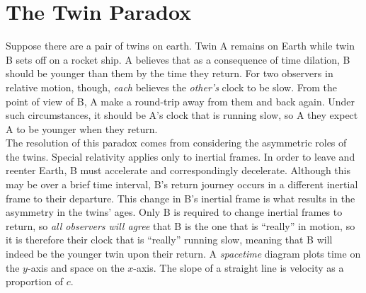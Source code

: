 \documentclass{subfiles}
\begin{document}
	\section{The Twin Paradox}
		Suppose there are a pair of twins on earth. Twin A remains on Earth while twin B sets off on a rocket ship. A believes that as a consequence of time dilation, B should be younger than them by the time they return. For two observers in relative motion, though, \textit{each} believes the \textit{other's} clock to be slow. From the point of view of B, A make a round-trip away from them and back again. Under such circumstances, it should be A's clock that is running slow, so A they expect A to be younger when they return. \\
			The resolution of this paradox comes from considering the asymmetric roles of the twins. Special relativity applies only to inertial frames. In order to leave and reenter Earth, B must accelerate and correspondingly decelerate. Although this may be over a brief time interval, B's return journey occurs in a different inertial frame to their departure. This change in B's inertial frame is what results in the asymmetry in the twins' ages. Only B is required to change inertial frames to return, so \textit{all observers will agree} that B is the one that is \enquote{really} in motion, so it is therefore their clock that is \enquote{really} running slow, meaning that B will indeed be the younger twin upon their return.
			A \textit{spacetime} diagram plots time on the \(y\)-axis and space on the \(x\)-axis. The slope of a straight line is velocity as a proportion of \(c\).
\end{document}
